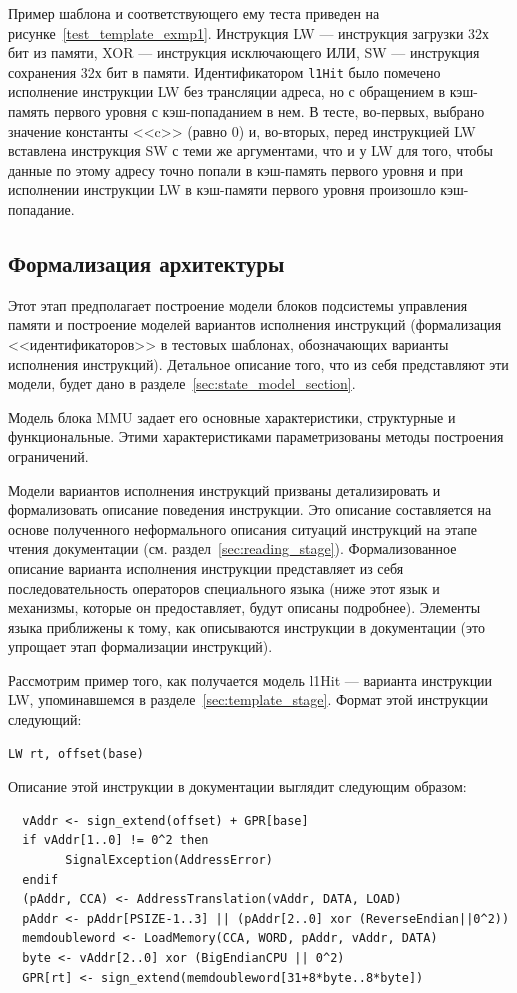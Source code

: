 Пример шаблона и соответствующего ему теста приведен на
рисунке~\ref{test_template_exmp1}. Инструкция LW --- инструкция загрузки 32х бит из памяти, XOR --- инструкция исключающего ИЛИ, SW --- инструкция сохранения 32х бит в памяти. Идентификатором \texttt{l1Hit} было помечено исполнение инструкции LW без трансляции адреса, но с обращением в кэш-память первого уровня с кэш-попаданием в нем. В тесте, во-первых, выбрано значение константы <<c>> (равно 0) и, во-вторых, перед инструкцией LW вставлена инструкция SW с теми же аргументами, что и у LW для того, чтобы данные по этому адресу точно попали в кэш-память первого уровня и при исполнении инструкции LW в кэш-памяти первого уровня произошло кэш-попадание.

\subsection{Формализация архитектуры}

Этот этап предполагает построение модели блоков подсистемы управления памяти и построение моделей вариантов исполнения инструкций (формализация <<идентификаторов>> в тестовых шаблонах, обозначающих варианты исполнения инструкций). Детальное описание того, что из себя представляют эти модели, будет дано в разделе~\ref{sec:state_model_section}.

Модель блока MMU задает его основные характеристики, структурные и функциональные. Этими характеристиками параметризованы методы построения ограничений.

Модели вариантов исполнения инструкций призваны детализировать и формализовать описание поведения инструкции. Это описание составляется на основе полученного неформального описания ситуаций инструкций на этапе чтения документации (см. раздел~\ref{sec:reading_stage}). Формализованное описание варианта исполнения инструкции представляет из себя последовательность операторов специального языка (ниже этот язык и механизмы, которые он предоставляет, будут описаны подробнее). Элементы языка приближены к тому, как описываются инструкции в документации (это упрощает этап формализации инструкций).

Рассмотрим пример того, как получается модель l1Hit --- варианта инструкции LW, упоминавшемся в разделе~\ref{sec:template_stage}. Формат этой инструкции следующий:
\begin{verbatim}
LW rt, offset(base)
\end{verbatim}

Описание этой инструкции в документации выглядит следующим образом:
\begin{verbatim}
  vAddr <- sign_extend(offset) + GPR[base]
  if vAddr[1..0] != 0^2 then
        SignalException(AddressError)
  endif
  (pAddr, CCA) <- AddressTranslation(vAddr, DATA, LOAD)
  pAddr <- pAddr[PSIZE-1..3] || (pAddr[2..0] xor (ReverseEndian||0^2))
  memdoubleword <- LoadMemory(CCA, WORD, pAddr, vAddr, DATA)
  byte <- vAddr[2..0] xor (BigEndianCPU || 0^2)
  GPR[rt] <- sign_extend(memdoubleword[31+8*byte..8*byte])
\end{verbatim}

